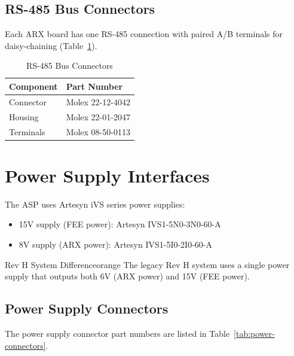 \subsection{RS-485 Bus Connectors}

Each ARX board has one RS-485 connection with paired A/B terminals for daisy-chaining (Table~\ref{tab:rs485-connectors}).

\begin{table}[htbp]
    \centering
    \caption{RS-485 Bus Connectors}
    \label{tab:rs485-connectors}
    \begin{tabular}{ll}
        \toprule
        \textbf{Component} & \textbf{Part Number} \\
        \midrule
        Connector & Molex 22-12-4042 \\
        Housing & Molex 22-01-2047 \\
        Terminals & Molex 08-50-0113 \\
        \bottomrule
    \end{tabular}
\end{table}

\section{Power Supply Interfaces}

The ASP uses Artesyn iVS series power supplies:
\begin{itemize}
    \item 15V supply (FEE power): Artesyn IVS1-5N0-3N0-60-A
    \item 8V supply (ARX power): Artesyn IVS1-5I0-2I0-60-A
\end{itemize}

\begin{calloutBox}{Rev H System Difference}{orange}
The legacy Rev H system uses a single power supply that outputs both 6V (ARX power) and 15V (FEE power).
\end{calloutBox}

\subsection{Power Supply Connectors}

The power supply connector part numbers are listed in Table~\ref{tab:power-connectors}.

